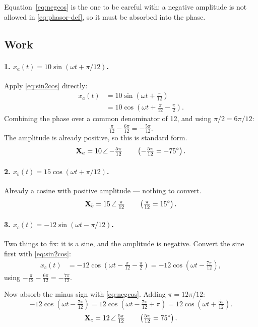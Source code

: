 Equation~\eqref{eq:negcos} is the one to be careful with: a negative amplitude
is not allowed in \eqref{eq:phasor-def}, so it must be absorbed into the phase.

\subsection*{Work}

\paragraph{1. $x_a(t) = 10\sin(\omega t + \pi/12)$.}
Apply \eqref{eq:sin2cos} directly:
\begin{align}
  x_a(t) &= 10\sin\!\left(\omega t + \tfrac{\pi}{12}\right) \\
         &= 10\cos\!\left(\omega t + \tfrac{\pi}{12} - \tfrac{\pi}{2}\right).
\end{align}
Combining the phase over a common denominator of 12, and using
$\pi/2 = 6\pi/12$:
\begin{equation}
  \tfrac{\pi}{12} - \tfrac{6\pi}{12} = -\tfrac{5\pi}{12}.
\end{equation}
The amplitude is already positive, so this is standard form.
\[
  \mathbf{X}_a = 10\,\angle\,\mathord{-\tfrac{5\pi}{12}}
  \qquad \left(-\tfrac{5\pi}{12} = -75^\circ\right).
\]

\paragraph{2. $x_b(t) = 15\cos(\omega t + \pi/12)$.}
Already a cosine with positive amplitude — nothing to convert.
\[
  \mathbf{X}_b = 15\,\angle\,\mathord{\tfrac{\pi}{12}}
  \qquad \left(\tfrac{\pi}{12} = 15^\circ\right).
\]

\paragraph{3. $x_c(t) = -12\sin(\omega t - \pi/12)$.}
Two things to fix: it is a sine, and the amplitude is negative. Convert the
sine first with \eqref{eq:sin2cos}:
\begin{align}
  x_c(t) &= -12\cos\!\left(\omega t - \tfrac{\pi}{12} - \tfrac{\pi}{2}\right)
          = -12\cos\!\left(\omega t - \tfrac{7\pi}{12}\right),
\end{align}
using $-\tfrac{\pi}{12} - \tfrac{6\pi}{12} = -\tfrac{7\pi}{12}$.

Now absorb the minus sign with \eqref{eq:negcos}. Adding $\pi = 12\pi/12$:
\begin{equation}
  -12\cos\!\left(\omega t - \tfrac{7\pi}{12}\right)
   = 12\cos\!\left(\omega t - \tfrac{7\pi}{12} + \pi\right)
   = 12\cos\!\left(\omega t + \tfrac{5\pi}{12}\right).
\end{equation}
\[
  \mathbf{X}_c = 12\,\angle\,\mathord{\tfrac{5\pi}{12}}
  \qquad \left(\tfrac{5\pi}{12} = 75^\circ\right).
\]

